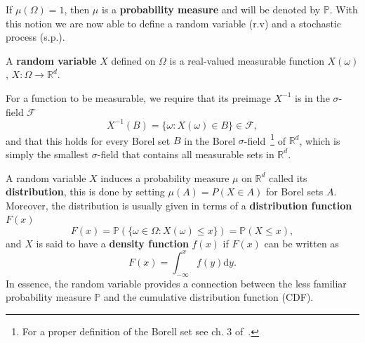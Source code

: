 If $\mu(\Omega)=1$, then $\mu$ is a \textbf{probability measure} and will be denoted by $\mathbb{P}$. With this notion we are now able to define a random variable (r.v) and a stochastic process (s.p.).
\begin{definition}
	 A \textbf{random variable} $X$ defined on $\Omega$ is a real-valued measurable function $X(\omega)$, $X: \Omega \rightarrow \mathbb{R}^d$.
\end{definition}
For a function to be measurable, we require that its preimage $X^{-1}$ is in the $\sigma$-field $\mathcal{F}$
\begin{equation}
	X^{-1}(B) = \{ \omega : X(\omega) \in B \} \in \mathcal{F},
\end{equation}
and that this holds for every Borel set $B$ in the Borel $\sigma$-field~\footnote{For a proper definition of the Borell set see ch. 3 of~\cite{salamon2016measure}.} of $\mathbb{R}^d$, which is simply the smallest $\sigma$-field that contains all measurable sets in $\mathbb{R}^d$. 

A random variable $X$ induces a probability measure $\mu$ on $\mathbb{R}^d$ called its \textbf{distribution}, this is done by setting $\mu(A)=P(X \in A)$ for Borel sets $A$. Moreover, the distribution is usually given in terms of a \textbf{distribution function} $F(x)$
\begin{equation}
	 F(x) = \mathbb{P}(\{\omega \in \Omega: X(\omega) \leq x\}) = \mathbb{P}(X \leq x),
\end{equation}
and $X$ is said to have a \textbf{density function} $f(x)$ if $F(x)$ can be written as 
\begin{equation}
	\label{eq:pdf}
	F(x)=\int_{-\infty}^{x} f(y) \mathrm{d}y.
\end{equation}
In essence, the random variable provides a connection between the less familiar probability measure $\mathbb{P}$ and the cumulative distribution function (CDF).

